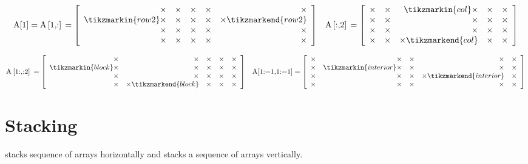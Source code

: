 \begin{align*}
\text{\li{A[1]}} = \text{\li{A[1,:]}} = \left[\begin{array}{rrrrr}
\times & \times & \times & \times & \times\\
\tikzmarkin{row2}\times & \times & \times & \times & \times\tikzmarkend{row2}\\
\times & \times & \times & \times & \times\\
\times & \times & \times & \times & \times\\
\end{array}\right]
&&
\text{\li{A[:,2]}} = \left[\begin{array}{rrrrr}
\times & \times & \tikzmarkin{col}\times & \times & \times\\
\times & \times & \times & \times & \times\\
\times & \times & \times & \times & \times\\
\times & \times & \times\tikzmarkend{col} & \times & \times
\end{array}\right]
\end{align*}

\begin{align*}
\text{\li{A[1:,:2]}} = \left[\begin{array}{rrrrr}
\times & \times & \times & \times & \times\\
\tikzmarkin{block}\times & \times & \times & \times & \times\\
\times & \times & \times & \times & \times\\
\times & \times\tikzmarkend{block} & \times & \times & \times
\end{array}\right]
&&
\text{\li{A[1:-1,1:-1]}} = \left[\begin{array}{rrrrr}
\times & \times & \times & \times & \times\\
\times & \tikzmarkin{interior} \times & \times & \times & \times\\
\times & \times & \times & \times \tikzmarkend{interior} & \times\\
\times & \times & \times & \times & \times\end{array}\right]
\end{align*}

\section*{Stacking} %

 stacks sequence of arrays horizontally and  stacks a sequence of arrays vertically.

